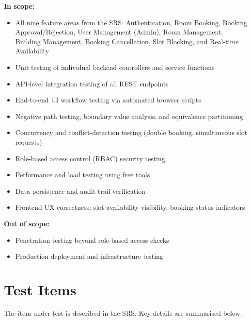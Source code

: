 \documentclass[12pt, a4paper]{article}
\begin{document}
\textbf{In scope:}
\begin{itemize}[noitemsep]
  \item All nine feature areas from the SRS: Authentication, Room Booking, Booking Approval/Rejection, User Management (Admin), Room Management, Building Management, Booking Cancellation, Slot Blocking, and Real-time Availability
  \item Unit testing of individual backend controllers and service functions
  \item API-level integration testing of all REST endpoints
  \item End-to-end UI workflow testing via automated browser scripts
  \item Negative path testing, boundary value analysis, and equivalence partitioning
  \item Concurrency and conflict-detection testing (double booking, simultaneous slot requests)
  \item Role-based access control (RBAC) security testing
  \item Performance and load testing using free tools
  \item Data persistence and audit trail verification
  \item Frontend UX correctness: slot availability visibility, booking status indicators
\end{itemize}

\textbf{Out of scope:}
\begin{itemize}[noitemsep]
  \item Penetration testing beyond role-based access checks
  \item Production deployment and infrastructure testing
\end{itemize}

\newpage
\section{Test Items}

The item under test is described in the SRS. Key details are summarised below.
\end{document}
